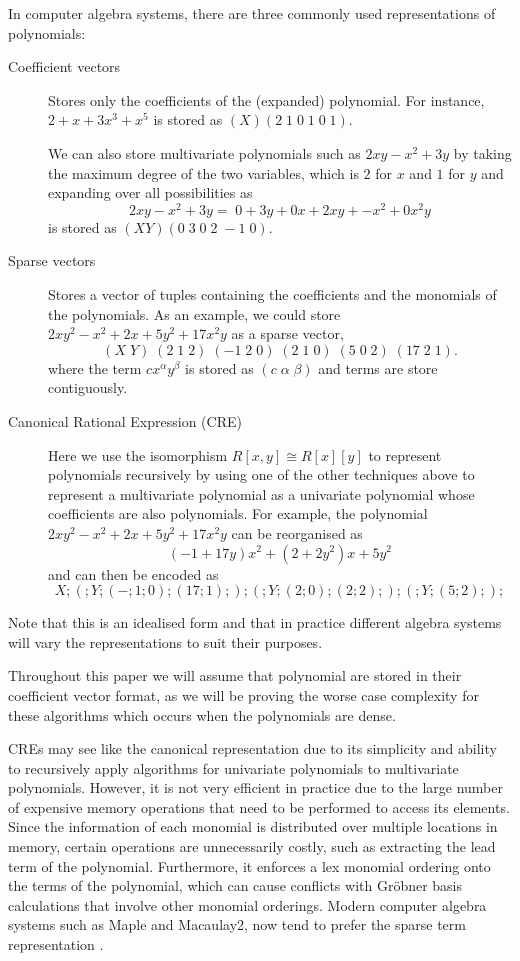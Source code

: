 In computer algebra systems, there are three commonly used representations of polynomials:
\begin{description}
    \item[Coefficient vectors] Stores only the coefficients of the (expanded) polynomial. For instance, $2 + x + 3x^3 + x^5$ is stored as $(X) (2\; 1\; 0\; 1\; 0\; 1)$.

        We can also store multivariate polynomials such as $2xy - x^2 + 3y$ by taking the maximum degree of the two variables, which is $2$ for $x$ and $1$ for $y$ and expanding over all possibilities as
        \[
            2xy - x^2 + 3y = \;0 + 3y + 0x + 2xy + \minus x^2 + 0x^2y
        \]
        is stored as  $(X Y) (0\; 3\; 0\; 2\; \minus 1\; 0)$.
    \item[Sparse vectors] Stores a vector of tuples containing the coefficients and the monomials of the polynomials. As an example, we could store $2xy^2 - x^2 + 2x + 5y^2 + 17x^2 y$ as a sparse vector,
        \[
            (X\; Y)\; (2\; 1\; 2)\; (\minus 1\; 2\; 0)\; (2\; 1\; 0)\; (5\; 0\; 2)\; (17\; 2\; 1).
        \]
        where the term $c x^\alpha y^\beta$ is stored as $(c\; \alpha \; \beta)$ and terms are store contiguously.

    \item[Canonical Rational Expression (CRE)] Here we use the isomorphism $R[x, y] \cong R[x][y]$ to represent polynomials recursively by using one of the other techniques above to represent a multivariate polynomial as a univariate polynomial whose coefficients are also polynomials. For example, the polynomial $2xy^2 - x^2 + 2x + 5y^2 + 17x^2 y$ can be reorganised as
        \[
            (\minus 1 + 17y)x^2 + (2 + 2y^2)x + 5y^2
        \]
        and can then be encoded as
        \[
            X; (; Y; (\minus; 1; 0); (17; 1); ); (; Y; (2; 0); (2; 2); ); (; Y; (5; 2); );
        \]
\end{description}

Note that this is an idealised form and that in practice different algebra systems will vary the representations to suit their purposes.

Throughout this paper we will assume that polynomial are stored in their coefficient vector format, as we will be proving the worse case complexity for these algorithms which occurs when the polynomials are dense.

\medskip

CREs may see like the canonical representation due to its simplicity and ability to recursively apply algorithms for univariate polynomials to multivariate polynomials. However, it is not very efficient in practice due to the large number of expensive memory operations that need to be performed to access its elements. Since the information of each monomial is distributed over multiple locations in memory, certain operations are unnecessarily costly, such as extracting the lead term of the polynomial. Furthermore, it enforces a lex monomial ordering onto the terms of the polynomial, which can cause conflicts with Gr\"{o}bner basis calculations that involve other monomial orderings. Modern computer algebra systems such as Maple and Macaulay2, now tend to prefer the sparse term representation \cite{maple-new-poly-structure}\cite{macaulay2-polynomial}.

